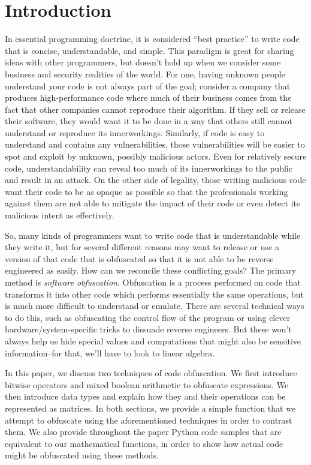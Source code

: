 \section{Introduction}
In essential programming doctrine, it is considered ``best practice'' to write code that
is concise, understandable, and simple. This paradigm is great for sharing ideas
with other programmers, but doesn't hold up when we consider some business and
security realities of the world. For one, having unknown people understand
your code is not always part of the goal; consider a company that produces
high-performance code where much of their business comes from the fact that
other companies cannot reproduce their algorithm. If they sell or
release their software, they would want it to be done in a way that others still
cannot understand or reproduce its innerworkings.
Similarly, if code is easy to understand and contains any vulnerabilities,
those vulnerabilities will be easier to spot and exploit by unknown, possibly
malicious actors. Even for relatively secure code, understandability can reveal
too much of its innerworkings to the public and result in an attack. On the 
other side of legality, those writing malicious code want their code to be 
as opaque as possible so that the professionals working against them are not
able to mitigate the impact of their code or even detect its malicious intent
as effectively.
\par So, many kinds of programmers want to write code that is understandable
while they write it, but for several different reasons may want to release or
use a version of that code that is obfuscated so that it is not
able to be reverse engineered as easily. How can we reconcile
these conflicting goals? The primary method is {\itshape software obfuscation}.
Obfuscation is a process performed on code that transforms it into other code
which performs essentially the same operations, but is much more difficult to
understand or emulate. There are several technical ways to do this, such as obfuscating
the control flow of the program or using clever hardware/system-specific tricks
to dissuade reverse engineers. But these won't always help us hide special values
and computations that might also be sensitive information--for that, we'll have to
look to linear algebra.

In this paper, we discuss two techniques of code obfuscation. We first
introduce bitwise operators and mixed boolean arithmetic to obfuscate
expressions. We then introduce data types and explain how they and
their operations can be represented as matrices. In both sections, we provide a
simple function that we attempt to obfuscate using the aforementioned
techniques in order to contrast them. We also provide throughout the paper
Python code samples that are equivalent to our mathematical functions, in order
to show how actual code might be obfuscated using these methods.

